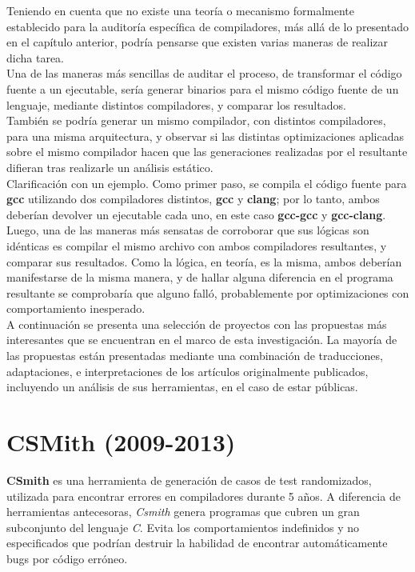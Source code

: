 Teniendo en cuenta que no existe una teoría o mecanismo formalmente establecido para la auditoría específica de compiladores, más allá de lo presentado en el capítulo anterior, podría pensarse que existen varias maneras de realizar dicha tarea.\\

Una de las maneras más sencillas de auditar el proceso, de transformar el código fuente a un ejecutable, sería generar binarios para el mismo código fuente de un lenguaje, mediante distintos compiladores, y comparar los resultados.\\

También se podría generar un mismo compilador, con distintos compiladores, para una misma arquitectura, y observar si las distintas optimizaciones aplicadas sobre el mismo compilador hacen que las generaciones realizadas por el resultante difieran tras realizarle un análisis estático.\\

Clarificación con un ejemplo. Como primer paso, se compila el código fuente para \textbf{gcc} utilizando dos compiladores distintos, \textbf{gcc} y \textbf{clang}; por lo tanto, ambos deberían devolver un ejecutable cada uno, en este caso \textbf{gcc-gcc} y \textbf{gcc-clang}. Luego, una de las maneras más sensatas de corroborar que sus lógicas son idénticas es compilar el mismo archivo con ambos compiladores resultantes, y comparar sus resultados. Como la lógica, en teoría, es la misma, ambos deberían manifestarse de la misma manera, y de hallar alguna diferencia en el programa resultante se comprobaría que alguno falló, probablemente por optimizaciones con comportamiento inesperado.\\

A continuación se presenta una selección de proyectos con las propuestas más interesantes que se encuentran en el marco de esta investigación. La mayoría de las propuestas están presentadas mediante una combinación de traducciones, adaptaciones, e interpretaciones de los artículos originalmente publicados, incluyendo un análisis de sus herramientas, en el caso de estar públicas.

\section{CSMith (2009-2013)}
\textbf{CSmith} es una herramienta de generación de casos de test randomizados, utilizada para encontrar errores en compiladores durante 5 años. A diferencia de herramientas antecesoras, \textit{Csmith} genera programas que cubren un gran subconjunto del lenguaje \textit{C}. Evita los comportamientos indefinidos y no especificados que podrían destruir la habilidad de encontrar automáticamente bugs por código erróneo. \\

